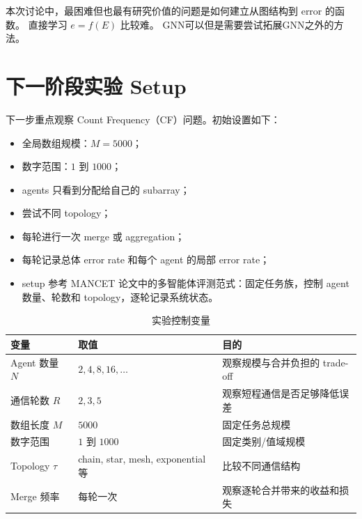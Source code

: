 \documentclass[UTF8,11pt,a4paper,fontset=fandol]{ctexart}
\begin{document}
本次讨论中，最困难但也最有研究价值的问题是如何建立从图结构到 error 的函数。
直接学习 \(e=f(E)\) 比较难。
GNN可以但是需要尝试拓展GNN之外的方法。

\section{下一阶段实验 Setup}

下一步重点观察 Count Frequency（CF）问题。初始设置如下：

\begin{itemize}
  \item 全局数组规模：\(M=5000\)；
  \item 数字范围：\(1\) 到 \(1000\)；
  \item agents 只看到分配给自己的 subarray；
  \item 尝试不同 topology；
  \item 每轮进行一次 merge 或 aggregation；
  \item 每轮记录总体 error rate 和每个 agent 的局部 error rate；
  \item setup 参考 MANCET 论文中的多智能体评测范式：固定任务族，控制 agent 数量、轮数和 topology，逐轮记录系统状态。
\end{itemize}

\begin{table}[h]
\centering
\caption{实验控制变量}
\begin{tabular}{lll}
\toprule
变量 & 取值 & 目的 \\
\midrule
Agent 数量 \(N\) & \(2,4,8,16,\ldots\) & 观察规模与合并负担的 trade-off \\
通信轮数 \(R\) & \(2,3,5\) & 观察短程通信是否足够降低误差 \\
数组长度 \(M\) & \(5000\) & 固定任务总规模 \\
数字范围 & \(1\) 到 \(1000\) & 固定类别/值域规模 \\
Topology \(\tau\) & chain, star, mesh, exponential 等 & 比较不同通信结构 \\
Merge 频率 & 每轮一次 & 观察逐轮合并带来的收益和损失 \\
\bottomrule
\end{tabular}
\end{table}
\end{document}

